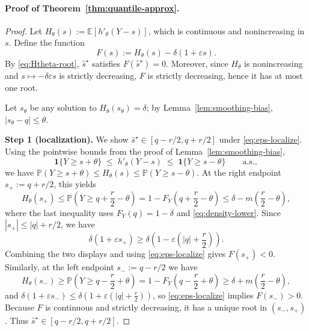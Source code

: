 \documentclass{uai2026} %
\theoremstyle{plain}
\theoremstyle{definition}
\begin{document}
\paragraph{Proof of Theorem~\ref{thm:quantile-approx}.}
\begin{proof}
Let $H_\theta(s):=\mathbb{E}[h'_\theta(Y-s)]$, which is continuous and nonincreasing in $s$.
Define the function
\[
  F(s):=H_\theta(s)-\delta(1+\varepsilon s).
\]
By \eqref{eq:Htheta-root}, $\widehat s^\star$ satisfies $F(\widehat s^\star)=0$.
Moreover, since $H_\theta$ is nonincreasing and $s\mapsto -\delta\varepsilon s$ is strictly decreasing, $F$ is strictly decreasing, hence it has at most one root.

Let $s_\theta$ be any solution to $H_\theta(s_\theta)=\delta$; by Lemma~\ref{lem:smoothing-bias}, $|s_\theta-q|\le \theta$.

\textbf{Step 1 (localization).}
We show $\widehat s^\star\in[q-r/2,q+r/2]$ under \eqref{eq:eps-localize}.
Using the pointwise bounds from the proof of Lemma~\ref{lem:smoothing-bias},
\[
  \mathbf{1}\{Y\ge s+\theta\}\;\le\; h'_\theta(Y-s)\;\le\;\mathbf{1}\{Y\ge s-\theta\}
  \qquad\text{a.s.},
\]
we have $ \mathbb{P}(Y\ge s+\theta)\le H_\theta(s)\le \mathbb{P}(Y\ge s-\theta)$.
At the right endpoint $s_+:=q+r/2$, this yields
\[
  H_\theta(s_+)\le \mathbb{P}\!\left(Y\ge q+\frac{r}{2}-\theta\right)
  = 1-F_Y\!\left(q+\frac{r}{2}-\theta\right)
  \le \delta - m\left(\frac{r}{2}-\theta\right),
 \]
where the last inequality uses $F_Y(q)=1-\delta$ and \eqref{eq:density-lower}.
Since $|s_+|\le |q|+r/2$, we have
\[
  \delta(1+\varepsilon s_+)\ge \delta\left(1-\varepsilon\left(|q|+\frac{r}{2}\right)\right).
\]
Combining the two displays and using \eqref{eq:eps-localize} gives $F(s_+)<0$.
Similarly, at the left endpoint $s_-:=q-r/2$ we have
\[
  H_\theta(s_-)\ge \mathbb{P}\!\left(Y\ge q-\frac{r}{2}+\theta\right)
  = 1-F_Y\!\left(q-\frac{r}{2}+\theta\right)
  \ge \delta + m\left(\frac{r}{2}-\theta\right),
\]
and $\delta(1+\varepsilon s_-)\le \delta\left(1+\varepsilon\left(|q|+\frac{r}{2}\right)\right)$, so \eqref{eq:eps-localize} implies $F(s_-)>0$.
Because $F$ is continuous and strictly decreasing, it has a unique root in $(s_-,s_+)$.
Thus $\widehat s^\star\in[q-r/2,q+r/2]$.


\end{proof}
\end{document}
